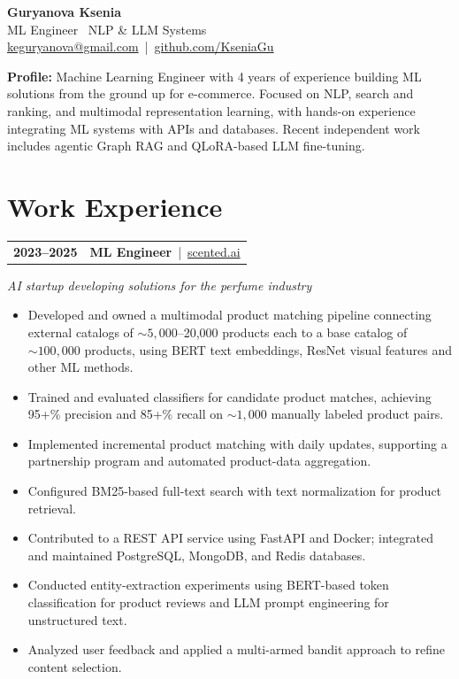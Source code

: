 \documentclass[12pt]{article}
\begin{document}
\begin{center}
    {\Large \textbf{Guryanova Ksenia}}\\[4pt]
    {\large ML Engineer \textbar\ NLP \& LLM Systems}\\[5pt]
    \href{mailto:keguryanova@gmail.com}{\textcolor{blue!65!black}{keguryanova@gmail.com}} \,|\,
    \href{https://github.com/KseniaGu}{\textcolor{blue!65!black}{github.com/KseniaGu}}
\end{center}


\noindent\textbf{Profile:} Machine Learning Engineer with 4 years of experience building ML solutions from the ground up for e-commerce. Focused on NLP, search and ranking, and multimodal representation learning, with hands-on experience integrating ML systems with APIs and databases. Recent independent work includes agentic Graph RAG and QLoRA-based LLM fine-tuning.

\section*{Work Experience}

\vspace{3pt}
\begin{tabularx}{\textwidth}{@{}l X@{}}
\textbf{2023--2025} & \textbf{ML Engineer} \,|\, \href{https://scented.ai/}{scented.ai}
\end{tabularx}
\vspace{2pt}
\textit{AI startup developing solutions for the perfume industry}
\begin{itemize}
  \item Developed and owned a multimodal product matching pipeline connecting external catalogs of \(\sim\!5{,}000\)–20,000 products each to a base catalog of \(\sim\!100{,}000\) products, using BERT text embeddings, ResNet visual features and other ML methods.
  \item Trained and evaluated classifiers for candidate product matches, achieving 95+\% precision and 85+\% recall on \(\sim\!1{,}000\) manually labeled product pairs.
  \item Implemented incremental product matching with daily updates, supporting a partnership program and automated product-data aggregation.
  \item Configured BM25-based full-text search with text normalization for product retrieval.
  \item Contributed to a REST API service using FastAPI and Docker; integrated and maintained PostgreSQL, MongoDB, and Redis databases.
  \item Conducted entity-extraction experiments using BERT-based token classification for product reviews and LLM prompt engineering for unstructured text.
  \item Analyzed user feedback and applied a multi-armed bandit approach to refine content selection.
\end{itemize}
\vspace{2pt}
\end{document}
